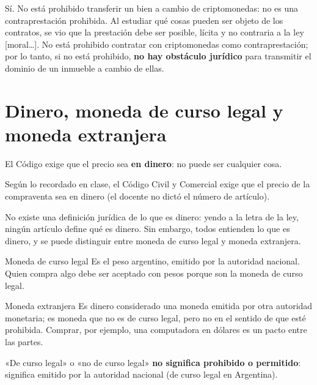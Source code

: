 \documentclass[12pt,oneside]{book}
\begin{document}
Sí. No está prohibido transferir un bien a cambio de criptomonedas: no es una contraprestación prohibida. Al estudiar qué cosas pueden ser objeto de los contratos, se vio que la prestación debe ser posible, lícita y no contraria a la ley [moral\ldots]. No está prohibido contratar con criptomonedas como contraprestación; por lo tanto, si no está prohibido, \textbf{no hay obstáculo jurídico} para transmitir el dominio de un inmueble a cambio de ellas.

\section{Dinero, moneda de curso legal y moneda extranjera}

El Código exige que el precio sea \textbf{en dinero}: no puede ser cualquier cosa.

\begin{note}
Según lo recordado en clase, el Código Civil y Comercial exige que el precio de la compraventa sea en dinero (el docente no dictó el número de artículo).
\end{note}

No existe una definición jurídica de lo que es dinero: yendo a la letra de la ley, ningún artículo define qué es dinero. Sin embargo, todos entienden lo que es dinero, y se puede distinguir entre moneda de curso legal y moneda extranjera.

\begin{definition}{Moneda de curso legal}
Es el peso argentino, emitido por la autoridad nacional. Quien compra algo debe ser aceptado con pesos porque son la moneda de curso legal.
\end{definition}

\begin{definition}{Moneda extranjera}
Es dinero considerado una moneda emitida por otra autoridad monetaria; es moneda que no es de curso legal, pero no en el sentido de que esté prohibida. Comprar, por ejemplo, una computadora en dólares es un pacto entre las partes.
\end{definition}

\begin{important}
«De curso legal» o «no de curso legal» \textbf{no significa prohibido o permitido}: significa emitido por la autoridad nacional (de curso legal en Argentina).
\end{important}
\end{document}
